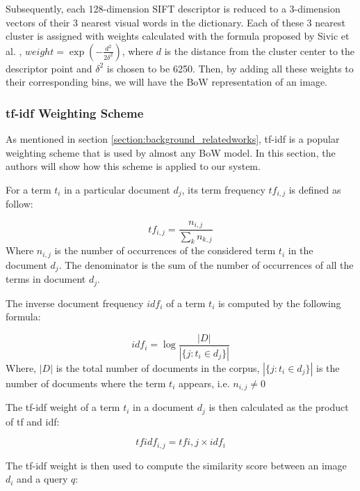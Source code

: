 Subsequently, each 128-dimension SIFT descriptor is reduced to a 3-dimension vectors of their 3 nearest visual words in the dictionary. Each of these 3 nearest cluster is assigned with weights calculated with the formula proposed by Sivic et al. \cite{7}, $weight = \exp(-\frac{d^2}{2\delta^2})$, where $d$ is the distance from the cluster center to the descriptor point and $\delta^2$ is chosen to be 6250. Then, by adding all these weights to their corresponding bins, we will have the BoW representation of an image.

\subsubsection{tf-idf Weighting Scheme} \label{section:tfidf_weighting}

As mentioned in section \ref{section:background_relatedworks}, tf-idf is a popular weighting scheme that is used by almost any BoW model. In this section, the authors will show how this scheme is applied to our system.

For a term $t_{i}$ in a particular document $d_{j}$, its term frequency $tf_{i, j}$ is defined as follow:

\begin{equation} 
        tf_{i, j} = \frac{n_{i, j}}{\sum\limits_{k} n_{k, j}}
\end{equation}
Where $n_{i, j}$ is the number of occurrences of the considered term $t_{i}$ in the document $d_{j}$. The denominator is the sum of the number of occurrences of all the terms in document $d_{j}$.

The inverse document frequency $idf_{i}$ of a term $t_{i}$ is computed by the following formula:

\begin{equation}
        idf_{i} = \log{\frac{\left|D\right|}{\left|\{j: t_{i} \in d_{j}\}\right|}}
\end{equation}
Where, $\left|D\right|$ is the total number of documents in the corpus, $\left|\{j: t_{i} \in d_{j}\}\right|$ is the number of documents where the term $t_{i}$ appears, i.e. $n_{i, j} \ne 0$

The tf-idf weight of a term $t_{i}$ in a document $d_{j}$ is then calculated as the product of tf and idf:

\begin{equation}
{tfidf}_{i, j} = tf{i, j} \times idf_{i}
\end{equation}

The tf-idf weight is then used to compute the similarity score between an image $d_{i}$ and a query $q$:

